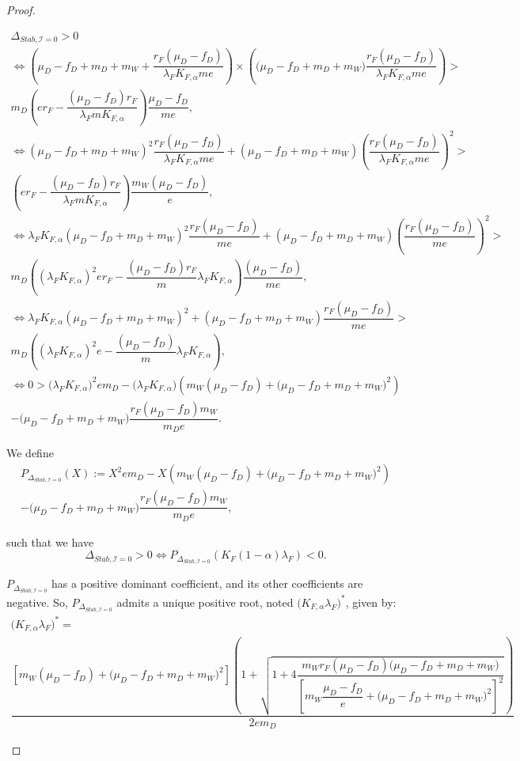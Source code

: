 \documentclass{article}
\newcommand{\lfw}{\lambda_{F}}
\newcommand{\lfw}{\lambda_{F}}
\newcommand{\Kfa}{K_{F,\alpha}}
\newcommand{\cI}{\mathcal{I}}
\begin{document}
\begin{proof}
\begin{itemize}
\begin{multline*}
\Delta_{Stab, \cI = 0} > 0 \\
\Leftrightarrow \left(\mu_D - f_D + m_D + m_W + \dfrac{r_F(\mu_D-f_D)}{\lfw \Kfa m e} \right) \times  \left(\big( \mu_D -f_D + m_D + m_W)\dfrac{r_F(\mu_D-f_D)}{\lfw \Kfa m e} \right) > \\ m_D\left(er_F - \dfrac{(\mu_D - f_D) r_F}{\lfw m \Kfa} \right) \dfrac{\mu_D - f_D}{m e}, \\
\Leftrightarrow \left(\mu_D - f_D + m_D + m_W \right)^2 \dfrac{r_F(\mu_D-f_D)}{\lfw \Kfa m e} + \left(\mu_D - f_D + m_D + m_W \right)\left(\dfrac{r_F(\mu_D-f_D)}{\lfw \Kfa m e} \right)^2 > \\ \left(er_F - \dfrac{(\mu_D - f_D) r_F}{\lfw m \Kfa} \right) \dfrac{m_W(\mu_D - f_D)}{e}, \\
\Leftrightarrow \lfw \Kfa \left(\mu_D - f_D + m_D + m_W \right)^2 \dfrac{r_F(\mu_D-f_D)}{m e} + \left(\mu_D - f_D + m_D + m_W \right)\left(\dfrac{r_F(\mu_D-f_D)}{m e} \right)^2 > \\m_D \left((\lfw \Kfa)^2 er_F - \dfrac{(\mu_D - f_D) r_F}{m}\lfw \Kfa  \right) \dfrac{(\mu_D - f_D)}{me}, \\
\Leftrightarrow \lfw \Kfa \left(\mu_D - f_D + m_D + m_W \right)^2 + \left(\mu_D - f_D + m_D + m_W \right)\dfrac{r_F(\mu_D-f_D)}{m e} > \\ m_D\left((\lfw \Kfa)^2 e - \dfrac{(\mu_D - f_D) }{m}\lfw \Kfa  \right), \\
\Leftrightarrow 0 > \Big(\lfw \Kfa \Big)^2 em_D -  \Big(\lfw \Kfa \Big) \left(m_W (\mu_D - f_D) + \big(\mu_D - f_D + m_D + m_W\big)^2 \right) \\ - \big(\mu_D - f_D + m_D + m_W\big) \dfrac{r_F (\mu_D - f_D)m_W}{m_D e}.
\end{multline*}

We define 
\begin{multline*}
P_{\Delta_{Stab, \cI = 0}}(X) := X^2 em_D -  X \left(m_W (\mu_D - f_D) + \big(\mu_D - f_D + m_D + m_W\big)^2 \right) \\ - \big(\mu_D - f_D + m_D + m_W\big) \dfrac{r_F (\mu_D - f_D)m_W}{m_D e},
\end{multline*} 

such that we have 
\begin{equation}
\Delta_{Stab, \cI = 0} > 0 \Leftrightarrow P_{\Delta_{Stab, \cI = 0}}(K_F(1-\alpha)\lfw) < 0.
\label{equivalenceDeltaStabP}
\end{equation}

$P_{\Delta_{Stab, \cI = 0}}$ has a positive dominant coefficient, and its other coefficients are negative. So,  $P_{\Delta_{Stab, \cI = 0}}$ admits a unique positive root, noted $\Big(\Kfa \lfw \Big)^*$, given by:
\begin{multline}
\Big(\Kfa \lfw \Big)^* = \\
 \dfrac{\left[m_{W}(\mu_{D}-f_{D})+\big(\mu_{D}-f_{D}+m_{D}+m_{W})^{2}\right]\left(1+\sqrt{1+4\dfrac{m_{W}r_{F}\left(\mu_{D}-f_{D}\right)\big(\mu_{D}-f_{D}+m_{D}+m_{W})}{\left[m_{W}\dfrac{\mu_{D}-f_{D}}{e}+\big(\mu_{D}-f_{D}+m_{D}+m_{W})^{2}\right]^{2}}}\right)}{2em_D}
\end{multline}


\end{itemize}
\end{proof}
\end{document}
